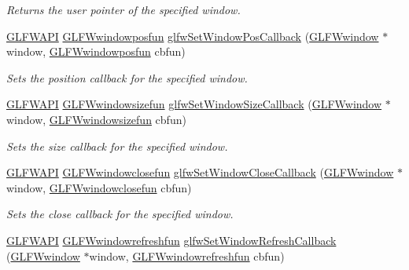 \begin{DoxyCompactItemize}
\begin{DoxyCompactList}\small\item\em Returns the user pointer of the specified window. \end{DoxyCompactList}\item 
\hyperlink{glfw3_8h_a56da5036b2cc259351ae22fd6439bb47}{G\-L\-F\-W\-A\-P\-I} \hyperlink{group__window_ga1c36e52549efd47790eb3f324da71924}{G\-L\-F\-Wwindowposfun} \hyperlink{group__window_gaea610899c4cb070dcd655c6de1fe1d2c}{glfw\-Set\-Window\-Pos\-Callback} (\hyperlink{group__window_ga3c96d80d363e67d13a41b5d1821f3242}{G\-L\-F\-Wwindow} $\ast$window, \hyperlink{group__window_ga1c36e52549efd47790eb3f324da71924}{G\-L\-F\-Wwindowposfun} cbfun)
\begin{DoxyCompactList}\small\item\em Sets the position callback for the specified window. \end{DoxyCompactList}\item 
\hyperlink{glfw3_8h_a56da5036b2cc259351ae22fd6439bb47}{G\-L\-F\-W\-A\-P\-I} \hyperlink{group__window_gaaca1c2715759d03da9834eac19323d4a}{G\-L\-F\-Wwindowsizefun} \hyperlink{group__window_ga150dad5f364425916c5816074cffa5e7}{glfw\-Set\-Window\-Size\-Callback} (\hyperlink{group__window_ga3c96d80d363e67d13a41b5d1821f3242}{G\-L\-F\-Wwindow} $\ast$window, \hyperlink{group__window_gaaca1c2715759d03da9834eac19323d4a}{G\-L\-F\-Wwindowsizefun} cbfun)
\begin{DoxyCompactList}\small\item\em Sets the size callback for the specified window. \end{DoxyCompactList}\item 
\hyperlink{glfw3_8h_a56da5036b2cc259351ae22fd6439bb47}{G\-L\-F\-W\-A\-P\-I} \hyperlink{group__window_ga07cff8bd3b3d573ecf49bb02d7669c1f}{G\-L\-F\-Wwindowclosefun} \hyperlink{group__window_ga5b827da350141c789acd64f5c4f7a0e1}{glfw\-Set\-Window\-Close\-Callback} (\hyperlink{group__window_ga3c96d80d363e67d13a41b5d1821f3242}{G\-L\-F\-Wwindow} $\ast$window, \hyperlink{group__window_ga07cff8bd3b3d573ecf49bb02d7669c1f}{G\-L\-F\-Wwindowclosefun} cbfun)
\begin{DoxyCompactList}\small\item\em Sets the close callback for the specified window. \end{DoxyCompactList}\item 
\hyperlink{glfw3_8h_a56da5036b2cc259351ae22fd6439bb47}{G\-L\-F\-W\-A\-P\-I} \hyperlink{group__window_ga16764f89bf2060e6fa477f0943e1412b}{G\-L\-F\-Wwindowrefreshfun} \hyperlink{group__window_ga9d2621fbc271a0cdc0ce91f9749f46e3}{glfw\-Set\-Window\-Refresh\-Callback} (\hyperlink{group__window_ga3c96d80d363e67d13a41b5d1821f3242}{G\-L\-F\-Wwindow} $\ast$window, \hyperlink{group__window_ga16764f89bf2060e6fa477f0943e1412b}{G\-L\-F\-Wwindowrefreshfun} cbfun)

\end{DoxyCompactItemize}
